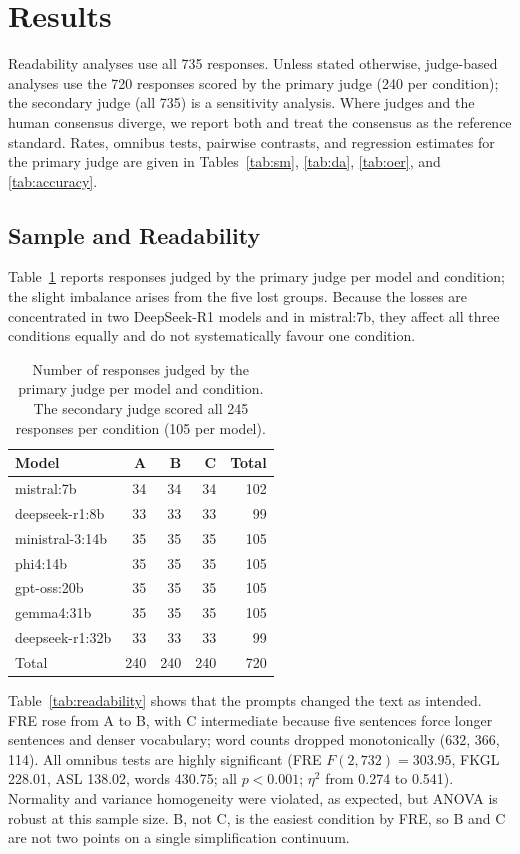 \documentclass[journal,article,submit,pdftex,moreauthors]{Definitions/mdpi}
\begin{document}
\section{Results}
\label{sec:results}

Readability analyses use all 735 responses. Unless stated otherwise, judge-based analyses use the 720 responses scored by the primary judge (240 per condition); the secondary judge (all 735) is a sensitivity analysis. Where judges and the human consensus diverge, we report both and treat the consensus as the reference standard. Rates, omnibus tests, pairwise contrasts, and regression estimates for the primary judge are given in Tables~\ref{tab:sm}, \ref{tab:da}, \ref{tab:oer}, and \ref{tab:accuracy}.

\subsection{Sample and Readability}

Table~\ref{tab:sample} reports responses judged by the primary judge per model and condition; the slight imbalance arises from the five lost groups. Because the losses are concentrated in two DeepSeek-R1 models and in mistral:7b, they affect all three conditions equally and do not systematically favour one condition.
\begin{table}[H]
\caption{Number of responses judged by the primary judge per model and condition. The secondary judge scored all 245 responses per condition (105 per model).}
\label{tab:sample}
\centering
\small
\begin{tabular}{lrrrr}
\toprule
Model & A & B & C & Total \\
\midrule
mistral:7b & 34 & 34 & 34 & 102 \\
deepseek-r1:8b & 33 & 33 & 33 & 99 \\
ministral-3:14b & 35 & 35 & 35 & 105 \\
phi4:14b & 35 & 35 & 35 & 105 \\
gpt-oss:20b & 35 & 35 & 35 & 105 \\
gemma4:31b & 35 & 35 & 35 & 105 \\
deepseek-r1:32b & 33 & 33 & 33 & 99 \\
\midrule
Total & 240 & 240 & 240 & 720 \\
\bottomrule
\end{tabular}
\end{table}

Table~\ref{tab:readability} shows that the prompts changed the text as intended. FRE rose from A to B, with C intermediate because five sentences force longer sentences and denser vocabulary; word counts dropped monotonically (632, 366, 114). All omnibus tests are highly significant (FRE $F(2, 732) = 303.95$, FKGL 228.01, ASL 138.02, words 430.75; all $p < 0.001$; $\eta^2$ from 0.274 to 0.541). Normality and variance homogeneity were violated, as expected, but ANOVA is robust at this sample size. B, not C, is the easiest condition by FRE, so B and C are not two points on a single simplification continuum.
\end{document}
